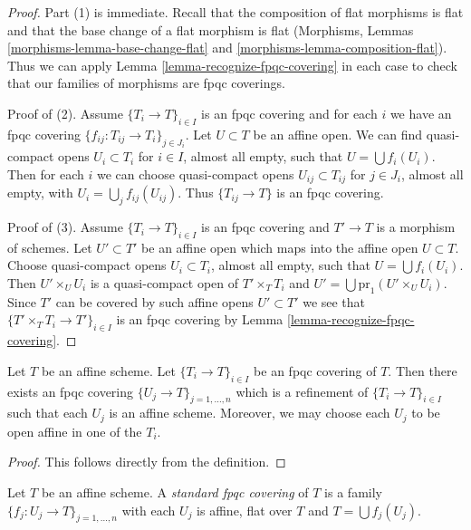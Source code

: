 \begin{proof}
Part (1) is immediate. Recall that the composition of flat morphisms
is flat and that the base change of a flat morphism is flat
(Morphisms, Lemmas \ref{morphisms-lemma-base-change-flat} and
\ref{morphisms-lemma-composition-flat}).
Thus we can apply Lemma \ref{lemma-recognize-fpqc-covering}
in each case to check that our families of morphisms are fpqc coverings.

\medskip\noindent
Proof of (2). Assume $\{T_i \to T\}_{i\in I}$ is an fpqc covering and for each
$i$ we have an fpqc covering $\{f_{ij} : T_{ij} \to T_i\}_{j\in J_i}$.
Let $U \subset T$ be an affine open. We can find
quasi-compact opens $U_i \subset T_i$ for $i \in I$, almost all empty,
such that $U = \bigcup f_i(U_i)$. Then for each $i$ we can choose
quasi-compact opens $U_{ij} \subset T_{ij}$ for $j \in J_i$, almost all empty,
with $U_i = \bigcup_j f_{ij}(U_{ij})$. Thus
$\{T_{ij} \to T\}$ is an fpqc covering.

\medskip\noindent
Proof of (3). Assume $\{T_i \to T\}_{i\in I}$ is an fpqc covering
and $T' \to T$ is a morphism of schemes. Let $U' \subset T'$ be an affine
open which maps into the affine open $U \subset T$. Choose
quasi-compact opens $U_i \subset T_i$, almost all empty,
such that $U = \bigcup f_i(U_i)$. Then $U' \times_U U_i$ is
a quasi-compact open of $T' \times_T T_i$ and
$U' = \bigcup \text{pr}_1(U' \times_U U_i)$. Since $T'$
can be covered by such affine opens $U' \subset T'$ we see
that $\{T' \times_T T_i \to T'\}_{i\in I}$ is an fpqc covering by
Lemma \ref{lemma-recognize-fpqc-covering}.
\end{proof}

\begin{lemma}
\label{lemma-fpqc-affine}
Let $T$ be an affine scheme.
Let $\{T_i \to T\}_{i \in I}$ be an fpqc covering of $T$.
Then there exists an fpqc covering
$\{U_j \to T\}_{j = 1, \ldots, n}$ which is a refinement
of $\{T_i \to T\}_{i \in I}$ such that each $U_j$ is an affine
scheme. Moreover, we may choose each $U_j$ to be open affine
in one of the $T_i$.
\end{lemma}

\begin{proof}
This follows directly from the definition.
\end{proof}

\begin{definition}
\label{definition-standard-fpqc}
Let $T$ be an affine scheme. A {\it standard fpqc covering}
of $T$ is a family $\{f_j : U_j \to T\}_{j = 1, \ldots, n}$
with each $U_j$ is affine, flat over $T$ and $T = \bigcup f_j(U_j)$.
\end{definition}

